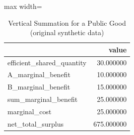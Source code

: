 \begin{table}[htbp]
\centering
\caption{Vertical Summation for a Public Good (original synthetic data)}
\begingroup
\small
\setlength{\tabcolsep}{6pt}
\renewcommand{\arraystretch}{1.12}
\begin{adjustbox}{max width=\linewidth}
\begin{tabular}{@{}lr@{}}
\toprule
 & value \\
\midrule
efficient\_shared\_quantity & 30.000000 \\
A\_marginal\_benefit & 10.000000 \\
B\_marginal\_benefit & 15.000000 \\
sum\_marginal\_benefit & 25.000000 \\
marginal\_cost & 25.000000 \\
net\_total\_surplus & 675.000000 \\
\bottomrule
\end{tabular}
\end{adjustbox}
\endgroup
\end{table}